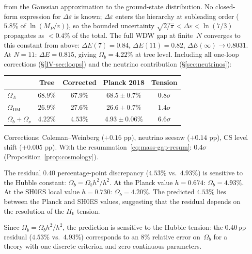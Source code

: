from the Gaussian approximation to the ground-state distribution.
No closed-form expression for $\Delta\varepsilon$ is known;
$\Delta\varepsilon$ enters the hierarchy at subleading order
($5.8\%$ of $\ln(M_P/v)$), so the bounded uncertainty
$\sqrt{2/\pi} < \Delta\varepsilon < \ln(7/3)$ propagates as
$< 0.4\%$ of the total.
The full WDW gap at finite~$N$ converges to this constant from above:
$\Delta E(7) = 0.84$, $\Delta E(11) = 0.82$,
$\Delta E(\infty) \to 0.8031$.
At $N = 11$: $\Delta E = 0.815$, giving $\Omega_b = 4.22\%$ at tree level.
Including all one-loop corrections (\S\ref*{IV-sec:loops}) and
the neutrino contribution (\S\ref{sec:neutrinos}):
\begin{center}
\small
\begin{tabular}{lcccc}
\toprule
& Tree & Corrected & Planck 2018 \citep{Planck2018} & Tension \\
\midrule
$\Omega_\Lambda$ & $68.9\%$ & $67.9\%$ & $68.5 \pm 0.7\%$ & $0.8\sigma$ \\
$\Omega_{\mathrm{DM}}$ & $26.9\%$ & $27.6\%$ & $26.6 \pm 0.7\%$ & $1.4\sigma$ \\
$\Omega_b + \Omega_\nu$ & $4.22\%$ & $4.53\%$ & $4.93 \pm 0.06\%$ & $6.6\sigma$ \\
\bottomrule
\end{tabular}
\end{center}
\noindent
Corrections: Coleman--Weinberg ($+0.16$ pp),
neutrino seesaw ($+0.14$ pp), CS level shift ($+0.005$ pp).
With the resummation~\eqref{eq:mass-gap-resum}: $0.4\sigma$
(Proposition~\ref{prop:cosmology}).

The residual $0.40$ percentage-point discrepancy
($4.53\%$ vs.\ $4.93\%$) is sensitive to the Hubble constant:
$\Omega_b = \Omega_b h^2 / h^2$.
At the Planck value $h = 0.674$: $\Omega_b = 4.93\%$.
At the SH0ES local value \citep{Riess2022} $h = 0.730$: $\Omega_b = 4.20\%$.
The predicted $4.53\%$ lies between the Planck and SH0ES
values, suggesting that the residual depends on the resolution
of the $H_0$ tension.

\begin{remark}[Sensitivity to $H_0$]
Since $\Omega_b = \Omega_b h^2 / h^2$, the prediction
is sensitive to the Hubble tension: the $0.40$\,pp residual
($4.53\%$ vs.\ $4.93\%$) corresponds to an $8\%$ relative
error on~$\Omega_b$ for a theory with one discrete criterion
and zero continuous parameters.
\end{remark}

